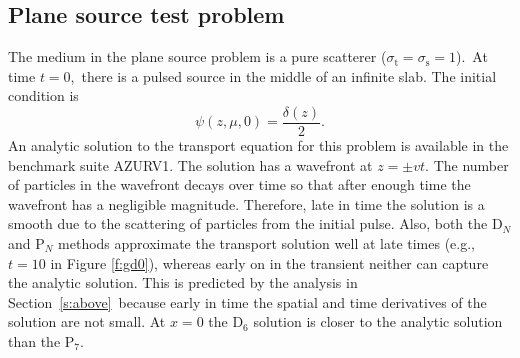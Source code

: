 \documentclass[review]{elsarticle}
\newcommand{\st}{\sigma_\mathrm{t}}
\newcommand{\pn}{P$_N$}
\newcommand{\dn}{D$_N$}
\begin{document}
\subsection{Plane source test problem}
The medium in the plane source problem is a pure scatterer ($\st =\sigma_\mathrm{s}=1$).~At time $t=0$,~there is a pulsed source in the middle of an infinite slab. The initial condition is
\begin{equation}
\psi(z,\mu,0)=\frac{\delta(z)}{2}.
\end{equation}
{
An analytic solution to the transport equation for this problem is available in the benchmark suite AZURV1\cite{ganapol}.
The solution has a wavefront at $z=\pm vt$. The number of particles in the wavefront decays over time so that after enough time the wavefront has a negligible magnitude. Therefore, late in time the solution is a smooth due to the scattering of particles from the initial pulse. Also, both the \dn\: and \pn\: methods approximate the transport solution well at late times (e.g., $t=10$ in Figure \ref{f:gd0}), whereas early on in the transient neither can capture the analytic solution. This is predicted by the analysis in Section\ \ref{s:above}\ because early in time the spatial and time derivatives of the solution are not small. At $x=0$ the D$_6$ solution is closer to the analytic solution than the P$_7$. 
	}
\end{document}
